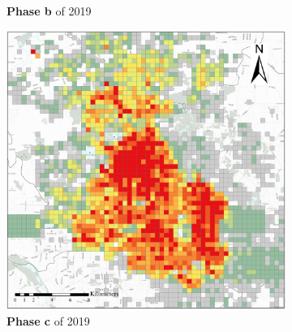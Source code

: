 \documentclass[preprints,article,accept,moreauthors,pdftex]{Definitions/mdpi}
\begin{document}
\begin{figure}[ht]
\begin{subfigure}{.28\textwidth}
        \caption{\textbf{Phase b} of 2019}\label{fig:p_b_2019}
    \end{subfigure}
    \begin{subfigure}{.28\textwidth}
        \includegraphics[width=\textwidth]{Figures/BSSPhase3_2019.eps}
        \caption{\textbf{Phase c} of 2019}\label{fig:p_c_2019}
    \end{subfigure}
    \begin{subfigure}{.14\textwidth}

\end{subfigure}
\end{figure}
\end{document}
